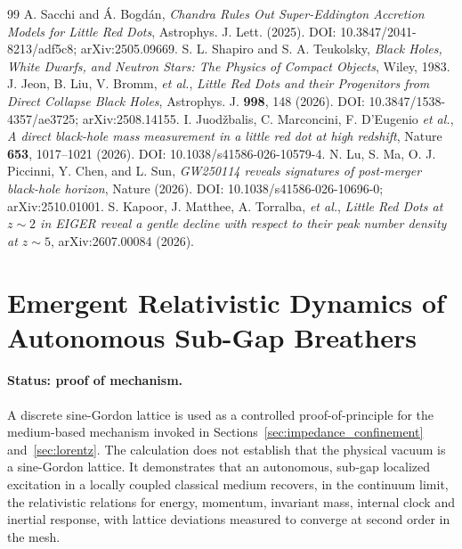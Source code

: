 \documentclass[11pt,a4paper]{article}
\theoremstyle{plain}
\theoremstyle{remark}
\begin{document}
\begin{thebibliography}{99}
 A. Sacchi and \'A. Bogd\'an, \emph{Chandra Rules Out Super-Eddington Accretion Models for Little Red Dots}, Astrophys. J. Lett. (2025). DOI: 10.3847/2041-8213/adf5c8; arXiv:2505.09669.
 S. L. Shapiro and S. A. Teukolsky, \textit{Black Holes, White Dwarfs, and Neutron Stars: The Physics of Compact Objects}, Wiley, 1983.
 J. Jeon, B. Liu, V. Bromm, \emph{et al.}, \emph{Little Red Dots and their Progenitors from Direct Collapse Black Holes}, Astrophys. J. \textbf{998}, 148 (2026). DOI: 10.3847/1538-4357/ae3725; arXiv:2508.14155.
 I. Juod\v{z}balis, C. Marconcini, F. D'Eugenio \emph{et al.}, \emph{A direct black-hole mass measurement in a little red dot at high redshift}, Nature \textbf{653}, 1017--1021 (2026). DOI: 10.1038/s41586-026-10579-4.
 N. Lu, S. Ma, O. J. Piccinni, Y. Chen, and L. Sun, \emph{GW250114 reveals signatures of post-merger black-hole horizon}, Nature (2026). DOI: 10.1038/s41586-026-10696-0; arXiv:2510.01001.
 S. Kapoor, J. Matthee, A. Torralba, \emph{et al.}, \emph{Little Red Dots at $z\sim2$ in EIGER reveal a gentle decline with respect to their peak number density at $z\sim5$}, arXiv:2607.00084 (2026).
\end{thebibliography}

\section{Emergent Relativistic Dynamics of Autonomous Sub-Gap Breathers}
\label{app:breathers}

\paragraph{Status: proof of mechanism.} A discrete sine-Gordon lattice is used as a controlled proof-of-principle for the medium-based mechanism invoked in Sections~\ref{sec:impedance_confinement} and~\ref{sec:lorentz}. The calculation does not establish that the physical vacuum is a sine-Gordon lattice. It demonstrates that an autonomous, sub-gap localized excitation in a locally coupled classical medium recovers, in the continuum limit, the relativistic relations for energy, momentum, invariant mass, internal clock and inertial response, with lattice deviations measured to converge at second order in the mesh.
\end{document}
